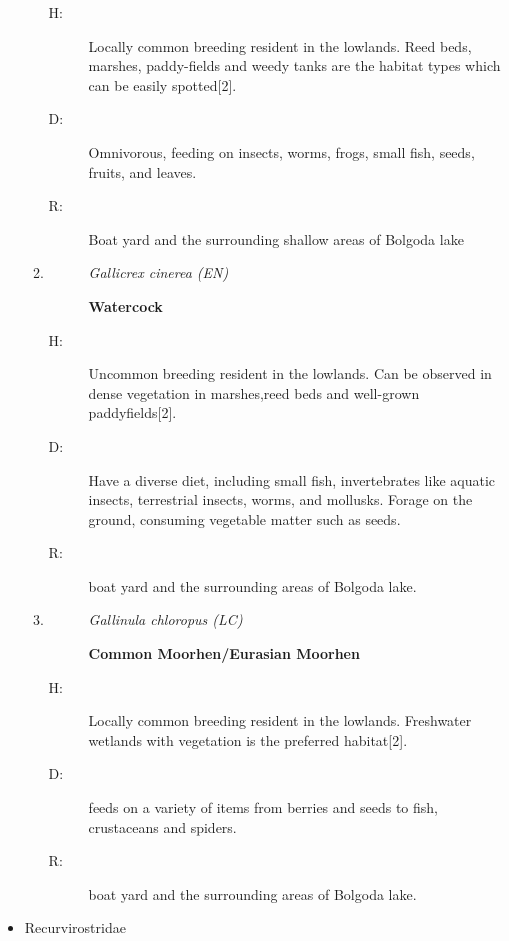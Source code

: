 \begin{itemize}
\begin{enumerate}
\begin{description}
\end{description}%
\begin{description}%
\item[H: ]%
Locally common breeding resident in the lowlands. Reed beds, marshes, paddy-fields and weedy tanks are the habitat types which can be easily spotted{[}2{]}.%
\item[D: ]%
Omnivorous, feeding on insects, worms, frogs, small fish, seeds, fruits, and leaves.%
\item[R: ]%
Boat yard and the surrounding shallow areas of Bolgoda lake%
\end{description}%
\item%
\begin{description}%
\item[]%
\textit{Gallicrex cinerea (EN)}%
\item[]%
\textbf{Watercock}%
\end{description}%
\begin{description}%
\item[H: ]%
Uncommon breeding resident in the lowlands. Can be observed in dense vegetation in marshes,reed beds and well{-}grown paddyfields{[}2{]}.%
\item[D: ]%
Have a diverse diet, including small fish, invertebrates like aquatic insects, terrestrial insects, worms, and mollusks. Forage on the ground, consuming vegetable matter such as seeds.%
\item[R: ]%
boat yard and the surrounding areas of Bolgoda lake.%
\end{description}%
\item%
\begin{description}%
\item[]%
\textit{Gallinula chloropus (LC)}%
\item[]%
\textbf{Common Moorhen/Eurasian Moorhen}%
\end{description}%
\begin{description}%
\item[H: ]%
Locally common breeding resident in the lowlands. Freshwater wetlands with vegetation is the preferred habitat{[}2{]}.%
\item[D: ]%
 feeds on a variety of items from berries and seeds to fish, crustaceans and spiders.%
\item[R: ]%
boat yard and the surrounding areas of Bolgoda lake.%
\end{description}%
\end{enumerate}%
\item%
Recurvirostridae%

\end{itemize}
